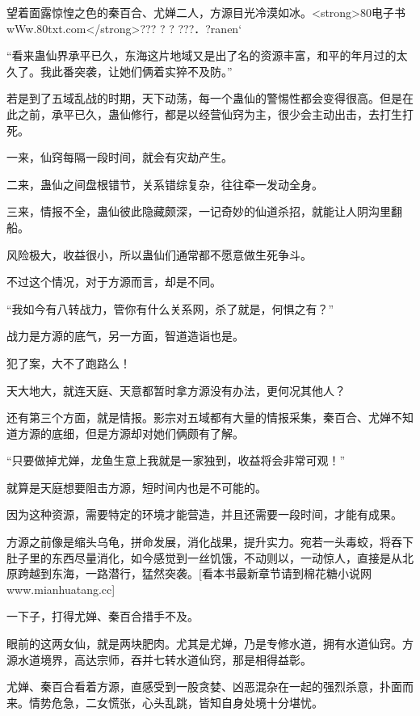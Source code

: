 
\begin{this_body}

望着面露惊惶之色的秦百合、尤婵二人，方源目光冷漠如冰。<strong>80电子书wWw.80txt.com</strong>??? ? ?  ???．?ranen`

“看来蛊仙界承平已久，东海这片地域又是出了名的资源丰富，和平的年月过的太久了。我此番突袭，让她们俩着实猝不及防。”

若是到了五域乱战的时期，天下动荡，每一个蛊仙的警惕性都会变得很高。但是在此之前，承平已久，蛊仙修行，都是以经营仙窍为主，很少会主动出击，去打生打死。

一来，仙窍每隔一段时间，就会有灾劫产生。

二来，蛊仙之间盘根错节，关系错综复杂，往往牵一发动全身。

三来，情报不全，蛊仙彼此隐藏颇深，一记奇妙的仙道杀招，就能让人阴沟里翻船。

风险极大，收益很小，所以蛊仙们通常都不愿意做生死争斗。

不过这个情况，对于方源而言，却是不同。

“我如今有八转战力，管你有什么关系网，杀了就是，何惧之有？”

战力是方源的底气，另一方面，智道造诣也是。

犯了案，大不了跑路么！

天大地大，就连天庭、天意都暂时拿方源没有办法，更何况其他人？

还有第三个方面，就是情报。影宗对五域都有大量的情报采集，秦百合、尤婵不知道方源的底细，但是方源却对她们俩颇有了解。

“只要做掉尤婵，龙鱼生意上我就是一家独到，收益将会非常可观！”

就算是天庭想要阻击方源，短时间内也是不可能的。

因为这种资源，需要特定的环境才能营造，并且还需要一段时间，才能有成果。

方源之前像是缩头乌龟，拼命发展，消化战果，提升实力。宛若一头毒蛟，将吞下肚子里的东西尽量消化，如今感觉到一丝饥饿，不动则以，一动惊人，直接是从北原跨越到东海，一路潜行，猛然突袭。[看本书最新章节请到棉花糖小说网www.mianhuatang.cc]

一下子，打得尤婵、秦百合措手不及。

眼前的这两女仙，就是两块肥肉。尤其是尤婵，乃是专修水道，拥有水道仙窍。方源水道境界，高达宗师，吞并七转水道仙窍，那是相得益彰。

尤婵、秦百合看着方源，直感受到一股贪婪、凶恶混杂在一起的强烈杀意，扑面而来。情势危急，二女慌张，心头乱跳，皆知自身处境十分堪忧。


\end{this_body}

